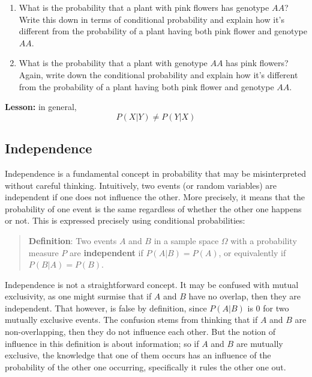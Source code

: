 \documentclass[
  letterpaper,
  DIV=11,
  numbers=noendperiod]{scrreprt}
\begin{document}
\begin{enumerate}
\def\labelenumi{\arabic{enumi}.}
\item
  What is the probability that a plant with pink flowers has genotype
  \(AA\)? Write this down in terms of conditional probability and
  explain how it's different from the probability of a plant having both
  pink flower and genotype \(AA\).
\item
  What is the probability that a plant with genotype \(AA\) has pink
  flowers? Again, write down the conditional probability and explain how
  it's different from the probability of a plant having both pink flower
  and genotype \(AA\).
\end{enumerate}

\textbf{Lesson:} in general, \[P(X \vert  Y ) \neq P(Y \vert  X)\]

\hypertarget{independence-1}{%
\subsection{Independence}\label{independence-1}}

Independence is a fundamental concept in probability that may be
misinterpreted without careful thinking. Intuitively, two events (or
random variables) are independent if one does not influence the other.
More precisely, it means that the probability of one event is the same
regardless of whether the other one happens or not. This is expressed
precisely using conditional probabilities:

\begin{quote}
\textbf{Definition}: Two events \(A\) and \(B\) in a sample space
\(\Omega\) with a probability measure \(P\) are \textbf{independent} if
\(P(A\vert B) = P(A)\), or equivalently if \(P(B\vert A) = P(B)\).
\end{quote}

Independence is not a straightforward concept. It may be confused with
mutual exclusivity, as one might surmise that if \(A\) and \(B\) have no
overlap, then they are independent. That however, is false by
definition, since \(P(A\vert B)\) is 0 for two mutually exclusive
events. The confusion stems from thinking that if \(A\) and \(B\) are
non-overlapping, then they do not influence each other. But the notion
of influence in this definition is about information; so if \(A\) and
\(B\) are mutually exclusive, the knowledge that one of them occurs has
an influence of the probability of the other one occurring, specifically
it rules the other one out.
\end{document}
